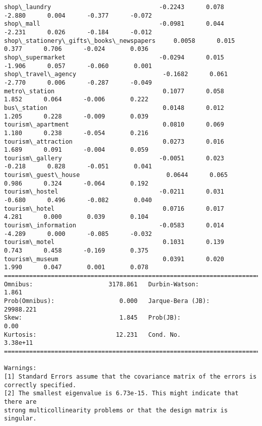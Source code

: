 \documentclass[11pt]{article}
\begin{document}
\begin{Verbatim}[commandchars=\\\{\}]
shop\_laundry                              -0.2243      0.078     -2.880      0.004      -0.377      -0.072
shop\_mall                                 -0.0981      0.044     -2.231      0.026      -0.184      -0.012
shop\_stationery\_gifts\_books\_newspapers     0.0058      0.015      0.377      0.706      -0.024       0.036
shop\_supermarket                          -0.0294      0.015     -1.906      0.057      -0.060       0.001
shop\_travel\_agency                        -0.1682      0.061     -2.770      0.006      -0.287      -0.049
metro\_station                              0.1077      0.058      1.852      0.064      -0.006       0.222
bus\_station                                0.0148      0.012      1.205      0.228      -0.009       0.039
tourism\_apartment                          0.0810      0.069      1.180      0.238      -0.054       0.216
tourism\_attraction                         0.0273      0.016      1.689      0.091      -0.004       0.059
tourism\_gallery                           -0.0051      0.023     -0.218      0.828      -0.051       0.041
tourism\_guest\_house                        0.0644      0.065      0.986      0.324      -0.064       0.192
tourism\_hostel                            -0.0211      0.031     -0.680      0.496      -0.082       0.040
tourism\_hotel                              0.0716      0.017      4.281      0.000       0.039       0.104
tourism\_information                       -0.0583      0.014     -4.289      0.000      -0.085      -0.032
tourism\_motel                              0.1031      0.139      0.743      0.458      -0.169       0.375
tourism\_museum                             0.0391      0.020      1.990      0.047       0.001       0.078
==============================================================================
Omnibus:                     3178.861   Durbin-Watson:                   1.861
Prob(Omnibus):                  0.000   Jarque-Bera (JB):            29988.221
Skew:                           1.845   Prob(JB):                         0.00
Kurtosis:                      12.231   Cond. No.                     3.38e+11
==============================================================================

Warnings:
[1] Standard Errors assume that the covariance matrix of the errors is correctly specified.
[2] The smallest eigenvalue is 6.73e-15. This might indicate that there are
strong multicollinearity problems or that the design matrix is singular.

    \end{Verbatim}
\end{document}
